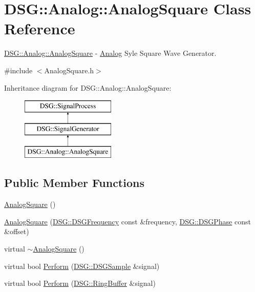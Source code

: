\hypertarget{class_d_s_g_1_1_analog_1_1_analog_square}{\section{D\+S\+G\+:\+:Analog\+:\+:Analog\+Square Class Reference}
\label{class_d_s_g_1_1_analog_1_1_analog_square}
}


\hyperlink{class_d_s_g_1_1_analog_1_1_analog_square}{D\+S\+G\+::\+Analog\+::\+Analog\+Square} -\/ \hyperlink{namespace_d_s_g_1_1_analog}{Analog} Syle Square Wave Generator.  




{\ttfamily \#include $<$Analog\+Square.\+h$>$}

Inheritance diagram for D\+S\+G\+:\+:Analog\+:\+:Analog\+Square\+:\begin{figure}[H]
\begin{center}
\leavevmode
\includegraphics[height=3.000000cm]{class_d_s_g_1_1_analog_1_1_analog_square}
\end{center}
\end{figure}
\subsection*{Public Member Functions}
\begin{DoxyCompactItemize}
\item 
\hyperlink{class_d_s_g_1_1_analog_1_1_analog_square_a7425ebd7e39129178eb050a04cd9d5d6}{Analog\+Square} ()
\item 
\hyperlink{class_d_s_g_1_1_analog_1_1_analog_square_a886eb67edded43efca895741559a55f4}{Analog\+Square} (\hyperlink{namespace_d_s_g_a4315a061386fa1014fda09b15d3a6973}{D\+S\+G\+::\+D\+S\+G\+Frequency} const \&frequency, \hyperlink{namespace_d_s_g_a44431ce1eb0a7300efdd207bc879e52c}{D\+S\+G\+::\+D\+S\+G\+Phase} const \&offset)
\item 
virtual \hyperlink{class_d_s_g_1_1_analog_1_1_analog_square_a17b3928f19cb6bf0c151b5e1159de1db}{$\sim$\+Analog\+Square} ()
\item 
virtual bool \hyperlink{class_d_s_g_1_1_analog_1_1_analog_square_a784aa17d266704647789b972cf880e9f}{Perform} (\hyperlink{namespace_d_s_g_ac39a94cd27ebcd9c1e7502d0c624894a}{D\+S\+G\+::\+D\+S\+G\+Sample} \&signal)
\item 
virtual bool \hyperlink{class_d_s_g_1_1_analog_1_1_analog_square_af4d41d5894ae02e920c61e06cf041c60}{Perform} (\hyperlink{class_d_s_g_1_1_ring_buffer}{D\+S\+G\+::\+Ring\+Buffer} \&signal)
\end{DoxyCompactItemize}

